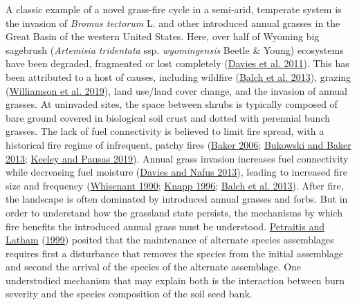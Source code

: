 \documentclass[
  12pt,
]{article}
\begin{document}
A classic example of a novel grass-fire cycle in a semi-arid, temperate
system is the invasion of \emph{Bromus tectorum} L. and other introduced
annual grasses in the Great Basin of the western United States. Here,
over half of Wyoming big sagebrush (\emph{Artemisia tridentata} ssp.
\emph{wyomingensis} Beetle \& Young) ecosystems have been degraded,
fragmented or lost completely (\protect\hyperlink{ref-Davies2011}{Davies
et al. 2011}). This has been attributed to a host of causes, including
wildfire (\protect\hyperlink{ref-Balch2013}{Balch et al. 2013}), grazing
(\protect\hyperlink{ref-Williamson2019}{Williamson et al. 2019}), land
use/land cover change, and the invasion of annual grasses. At uninvaded
sites, the space between shrubs is typically composed of bare ground
covered in biological soil crust and dotted with perennial bunch
grasses. The lack of fuel connectivity is believed to limit fire spread,
with a historical fire regime of infrequent, patchy fires
(\protect\hyperlink{ref-Baker2006}{Baker 2006};
\protect\hyperlink{ref-Bukowski2013}{Bukowski and Baker 2013};
\protect\hyperlink{ref-Keeley2019}{Keeley and Pausas 2019}). Annual
grass invasion increases fuel connectivity while decreasing fuel
moisture (\protect\hyperlink{ref-Davies2013}{Davies and Nafus 2013}),
leading to increased fire size and frequency
(\protect\hyperlink{ref-Whisenant1990}{Whisenant 1990};
\protect\hyperlink{ref-Knapp1996}{Knapp 1996};
\protect\hyperlink{ref-Balch2013}{Balch et al. 2013}). After fire, the
landscape is often dominated by introduced annual grasses and forbs. But
in order to understand how the grassland state persists, the mechanisms
by which fire benefits the introduced annual grass must be understood.
\protect\hyperlink{ref-Petraitis1999}{Petraitis and Latham}
(\protect\hyperlink{ref-Petraitis1999}{1999}) posited that the
maintenance of alternate species assemblages requires first a
disturbance that removes the species from the initial assemblage and
second the arrival of the species of the alternate assemblage. One
understudied mechanism that may explain both is the interaction between
burn severity and the species composition of the soil seed bank.
\end{document}
